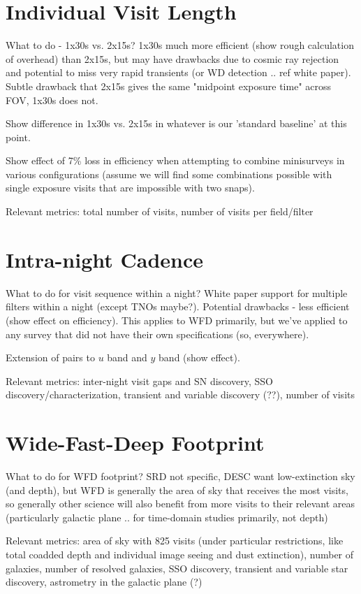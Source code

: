 




\section{Individual Visit Length}
What to do - 1x30s vs. 2x15s? 1x30s much more efficient (show rough calculation of overhead) than 2x15s, but may have drawbacks due to cosmic ray rejection and potential to miss very rapid transients (or WD detection .. ref white paper). Subtle drawback that 2x15s gives the same "midpoint exposure time" across FOV, 1x30s does not. 

Show difference in 1x30s vs. 2x15s in whatever is our 'standard baseline' at this point. 

Show effect of 7\% loss in efficiency when attempting to combine minisurveys in various configurations (assume we will find some combinations possible with single exposure visits that are impossible with two snaps). 

Relevant metrics: total number of visits, number of visits per field/filter

\section{Intra-night Cadence}
What to do for visit sequence within a night? White paper support for multiple filters within a night (except TNOs maybe?). Potential drawbacks - less efficient (show effect on efficiency). This applies to WFD primarily, but we've applied to any survey that did not have their own specifications (so, everywhere). 

Extension of pairs to $u$ band and $y$ band (show effect). 

Relevant metrics: inter-night visit gaps and SN discovery, SSO discovery/characterization, transient and variable discovery (??), number of visits

\section{Wide-Fast-Deep Footprint}
What to do for WFD footprint? SRD not specific, DESC want low-extinction sky (and depth), but WFD is generally the area of sky that receives the most visits, so generally other science will also benefit from more visits to their relevant areas (particularly galactic plane .. for time-domain studies primarily, not depth)

Relevant metrics: area of sky with 825 visits (under particular restrictions, like total coadded depth and individual image seeing and dust extinction), number of galaxies, number of resolved galaxies, SSO discovery, transient and variable star discovery, astrometry in the galactic plane (?)

